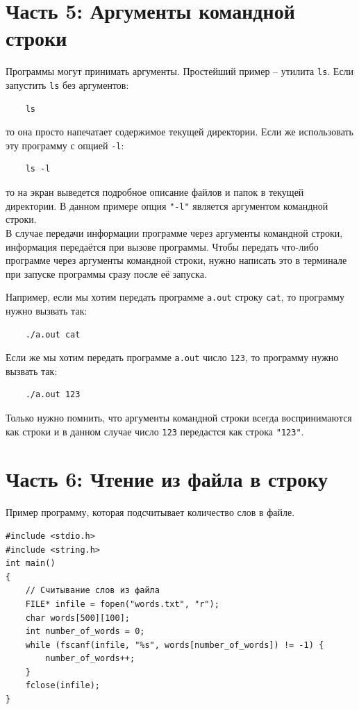 \documentclass{article}
\begin{document}
\section*{Часть 5: Аргументы командной строки}
Программы могут принимать аргументы. Простейший пример -- утилита \texttt{ls}. Если запустить \texttt{ls} без аргументов:
\begin{verbatim}
    ls
\end{verbatim}
то она просто напечатает содержимое текущей директории.  Если же использовать эту программу с опцией \texttt{-l}: 
\begin{verbatim}
    ls -l
\end{verbatim}
то на экран выведется подробное описание файлов и папок в текущей директории. В данном примере опция \texttt{"-l"} является аргументом командной строки. \\

В случае передачи информации программе через аргументы командной строки, информация передаётся при вызове 
программы. Чтобы передать что-либо программе через аргументы командной строки, нужно
написать это в терминале при запуске программы сразу после её запуска.

Например, если мы хотим передать программе \texttt{a.out} строку \texttt{cat}, то программу нужно вызвать так:
\begin{verbatim}
    ./a.out cat
\end{verbatim}

Если же мы хотим передать программе \texttt{a.out} число \texttt{123}, то программу нужно вызвать так:
\begin{verbatim}
    ./a.out 123
\end{verbatim}
Только нужно помнить, что аргументы командной строки всегда воспринимаются как строки и в данном случае 
число \texttt{123} передастся как строка \texttt{"123"}.

\newpage

\section*{Часть 6: Чтение из файла в строку}
Пример программу, которая подсчитывает количество слов в файле.
\begin{lstlisting}
#include <stdio.h>
#include <string.h>
int main() 
{
    // Считывание слов из файла
    FILE* infile = fopen("words.txt", "r");
    char words[500][100];
    int number_of_words = 0;
    while (fscanf(infile, "%s", words[number_of_words]) != -1) {
        number_of_words++;
    }
    fclose(infile);
}
\end{lstlisting}
\end{document}
